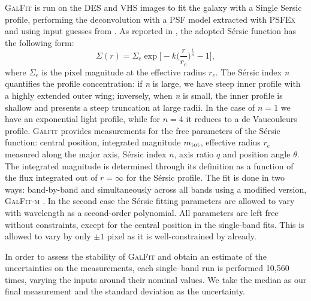 \textsc{GalFit} is run on the DES and VHS images to fit the galaxy with a Single Sersic profile, performing the deconvolution with a PSF model extracted with \textsc{PSFEx} \citep{psfex} and using input guesses from \sextractor. As reported in  \citep{Peng}, the adopted S\'ersic function has the following form: 
\begin{equation}
\Sigma(r) = \Sigma_e \exp{ \bigg[ -k \bigg(\frac{r}{r_e}\bigg)^{\frac{1}{n}} -1 \bigg]} ,
\label{eq:sersicfunction}
\end{equation}
where $\Sigma_e$ is the pixel magnitude at the effective radius $r_e$. The S\'ersic index \textit{n} quantifies the profile concentration: if \textit{n} is large, we have steep inner profile with a highly extended outer wing;  inversely, when \textit{n} is small, the inner profile is shallow and presents a steep truncation at large radii. In the case of $n=1$ we have an exponential light profile, while for $n=4$ it reduces to a de Vaucouleurs profile.
\textsc{Galfit} provides measurements for the free parameters of the S\'ersic function: central position, integrated magnitude $m_{\rm tot}$, effective radius $r_e$ measured along the major axis, S\'ersic index $n$, axis ratio $q$ and position angle $\theta$. The integrated magnitude is determined through its definition as a function of the flux integrated out of $r=\infty$ for the S\'ersic profile. %
The fit is done in two ways: band-by-band and simultaneously across all bands using a modified version, \textsc{GalFit-m} \citep{galfitm}. In the second case the S\'ersic fitting parameters are allowed to vary with wavelength as a second-order polynomial. %
All parameters are left free without constraints, except for the central position in the single-band fits. This is allowed to vary by only $\pm 1$ pixel as it is well-constrained by \sextractor already.

In order to assess the stability of \textsc{GalFit} and obtain an estimate of the uncertainties on the measurements, each single--band run is performed 10,560 times, varying the inputs around their nominal values. We take the median as our final measurement and the standard deviation as the uncertainty.

